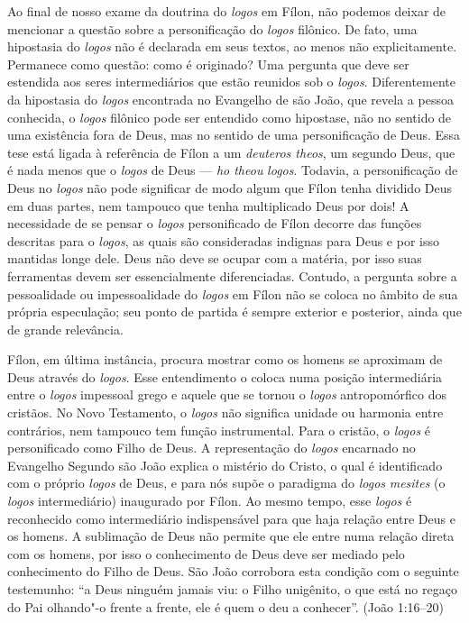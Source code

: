 Ao final de nosso exame da doutrina do \emph{logos} em Fílon,
não podemos deixar de mencionar a questão sobre a personificação
do \emph{logos} filônico. De fato, uma hipostasia do
\emph{logos} não é declarada em seus textos, ao menos não
explicitamente. Permanece como questão: como é originado? Uma
pergunta que deve ser estendida aos seres intermediários que
estão reunidos sob o \emph{logos}. Diferentemente da
hipostasia do \emph{logos} encontrada no {Evangelho de
são João}, que revela a pessoa conhecida, o \emph{logos}
filônico pode ser entendido como hipostase, não no sentido de
uma existência fora de Deus, mas no sentido de uma
personificação de Deus. Essa tese está ligada à referência de
Fílon a um \emph{deuteros theos}, um segundo Deus, que é nada
menos que o \emph{logos} de Deus --- \emph{ho theou}
\emph{logos}. Todavia, a personificação de Deus no
\emph{logos} não pode significar de modo algum que Fílon tenha
dividido Deus em duas partes, nem tampouco que tenha
multiplicado Deus por dois! A necessidade de se pensar o
\emph{logos} personificado de Fílon decorre das funções
descritas para o \emph{logos}, as quais são consideradas
indignas para Deus e por isso mantidas longe dele. Deus não deve
se ocupar com a matéria, por isso suas ferramentas devem ser
essencialmente diferenciadas. Contudo, a pergunta sobre a
pessoalidade ou impessoalidade do \emph{logos} em Fílon não se
coloca no âmbito de sua própria especulação; seu ponto de
partida é sempre exterior e posterior, ainda que de grande
relevância.

Fílon, em última instância, procura mostrar como os homens se
aproximam de Deus através do \emph{logos}. Esse entendimento o
coloca numa posição intermediária entre o \emph{logos}
impessoal grego e aquele que se tornou o \emph{logos}
antropomórfico dos cristãos. No {Novo Testamento}, o
\emph{logos} não significa unidade ou harmonia entre
contrários, nem tampouco tem função instrumental. Para o
cristão, o \emph{logos} é personificado como Filho de Deus. A
representação do \emph{logos} encarnado no {Evangelho
Segundo são João} explica o mistério do Cristo, o qual é
identificado com o próprio \emph{logos} de Deus, e para nós
supõe o paradigma do \emph{logos} \emph{mesites} (o
\emph{logos} intermediário) inaugurado por Fílon. Ao mesmo
tempo, esse \emph{logos} é reconhecido como intermediário
indispensável para que haja relação entre Deus e os homens. A
sublimação de Deus não permite que ele entre numa relação direta
com os homens, por isso o conhecimento de Deus deve ser mediado
pelo conhecimento do Filho de Deus. São João corrobora esta
condição com o seguinte testemunho: “a Deus ninguém jamais viu:
o Filho unigênito, o que está no regaço do Pai olhando"-o frente
a frente, ele é quem o deu a conhecer”. ({João} 1:16--20)

